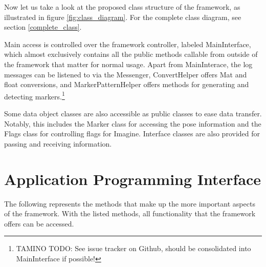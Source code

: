 Now let us take a look at the proposed class structure of the framework, as illustrated in figure \ref{fig:class_diagram}.
For the complete class diagram, see section \ref{complete_class}.

Main access is controlled over the framework controller, labeled MainInterface, which almost exclusively contains all the public methods callable from outside of the framework that matter for normal usage.
Apart from MainInterace, the log messages can be listened to via the Messenger, ConvertHelper offers Mat and float conversions, and MarkerPatternHelper offers methods for generating and detecting markers.\footnote{TAMINO TODO: See issue tracker on Github, should be consolidated into MainInterface if possible!}

Some data object classes are also accessible as public classes to ease data transfer.
Notably, this includes the Marker class for accessing the pose information and the Flags class for controlling flags for Imagine.
Interface classes are also provided for passing and receiving information.

\section{Application Programming Interface}

The following represents the methods that make up the more important aspects of the framework.
With the listed methods, all functionality that the framework offers can be accessed.

